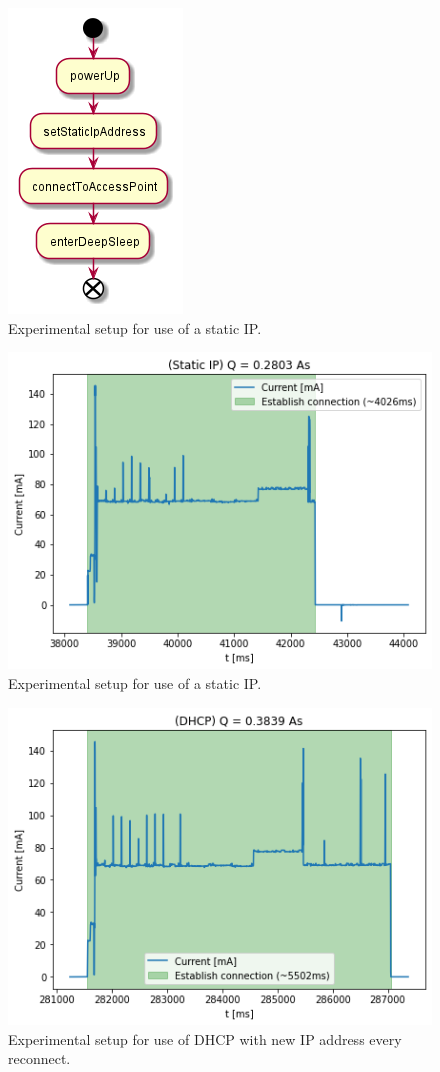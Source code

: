 \begin{figure}[h]
    \centering
    \includegraphics[width = 0.35 \linewidth]{fig/sequence_static_ip.png}
    \caption{Experimental setup for use of a static IP.}
    \label{fig:experiment_static_ip}
\end{figure}
\begin{figure}[h]
    \centering
    \includegraphics[width =\linewidth]{fig/static_ip.png}
    \caption{Experimental setup for use of a static IP.}
    \label{fig:static_ip}
\end{figure}
\begin{figure}[h] 
    \centering
    \includegraphics[width =\linewidth]{fig/dhcp.png}
    \caption{Experimental setup for use of DHCP with new IP address every reconnect.}
    \label{fig:dhcp}
\end{figure}